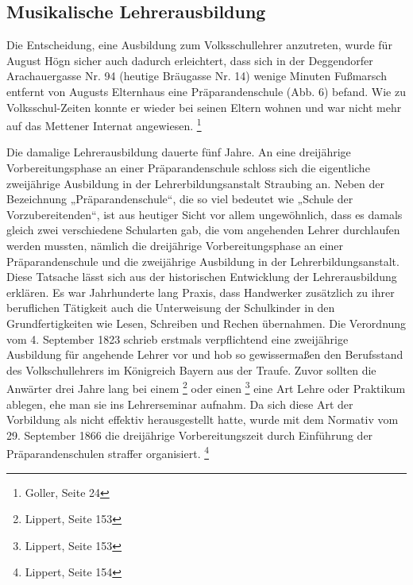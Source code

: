 \subsection{Musikalische Lehrerausbildung}

\hypertarget{RefHeadingToc100333727}{}Die Entscheidung, eine Ausbildung
zum Volksschullehrer anzutreten, wurde für August Högn sicher auch
dadurch erleichtert, dass sich in der Deggendorfer Arachauergasse Nr.
94 (heutige Bräugasse Nr. 14) wenige Minuten Fußmarsch entfernt von
Augusts Elternhaus eine Präparandenschule (Abb. 6) befand. Wie zu
Volksschul-Zeiten konnte er wieder bei seinen Eltern wohnen und war
nicht mehr auf das Mettener Internat angewiesen. \footnote{Goller,
Seite 24}

Die damalige Lehrerausbildung dauerte fünf Jahre. An eine dreijährige
Vorbereitungsphase an einer Präparandenschule schloss sich die
eigentliche zweijährige Ausbildung in der Lehrerbildungsanstalt
Straubing an. Neben der Bezeichnung „Präparandenschule“, die so viel
bedeutet wie „Schule der Vorzubereitenden“, ist aus heutiger Sicht vor
allem ungewöhnlich, dass es damals gleich zwei verschiedene Schularten
gab, die vom angehenden Lehrer durchlaufen werden mussten, nämlich die
dreijährige Vorbereitungsphase an einer Präparandenschule und die
zweijährige Ausbildung in der Lehrerbildungsanstalt. Diese Tatsache
lässt sich aus der historischen Entwicklung der Lehrerausbildung
erklären. Es war Jahrhunderte lang Praxis, dass Handwerker zusätzlich
zu ihrer beruflichen Tätigkeit auch die Unterweisung der Schulkinder in
den Grundfertigkeiten wie Lesen, Schreiben und Rechen übernahmen. Die
Verordnung vom 4. September 1823 schrieb erstmals verpflichtend eine
zweijährige Ausbildung für angehende Lehrer vor und hob so
gewissermaßen den Berufsstand des Volkschullehrers im Königreich Bayern
aus der Traufe. Zuvor sollten die Anwärter drei Jahre lang bei einem
 \footnote{Lippert, Seite
153} oder einen \footnote{
Lippert, Seite 153} eine Art Lehre oder Praktikum ablegen, ehe man sie
ins Lehrerseminar aufnahm. Da sich diese Art der Vorbildung als nicht
effektiv herausgestellt hatte, wurde mit dem Normativ vom 29. September
1866 die dreijährige Vorbereitungszeit durch Einführung der
Präparandenschulen straffer organisiert. \footnote{Lippert, Seite 154}

